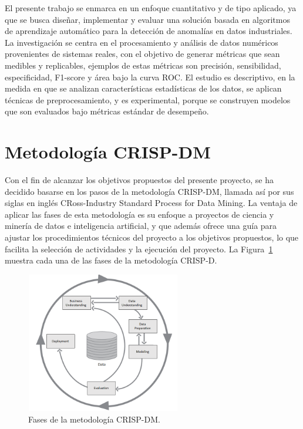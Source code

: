 \documentclass[11pt,a4paper,spanish]{book}
\numberwithin{equation}{chapter}
\numberwithin{figure}{chapter}
\begin{document}
El presente trabajo se enmarca en un enfoque cuantitativo y de tipo aplicado, ya que se 
busca diseñar, implementar y evaluar una solución basada en algoritmos de aprendizaje 
automático para la detección de anomalías en datos industriales. La investigación se 
centra en el procesamiento y análisis de datos numéricos provenientes de sistemas reales,
con el objetivo de generar métricas que sean medibles y replicables, ejemplos de estas 
métricas son precisión, sensibilidad, especificidad, F1-score y área bajo la curva ROC.
El estudio es descriptivo, en la medida en que se analizan características estadísticas 
de los datos, se aplican técnicas de preprocesamiento, y es experimental, porque se 
construyen modelos que son evaluados bajo métricas estándar de desempeño. 


\section{Metodología CRISP-DM}

Con el fin de alcanzar los objetivos propuestos del presente proyecto, se ha decidido 
basarse en los pasos de la metodología  CRISP-DM, llamada así por sus siglas en inglés 
CRoss-Industry Standard Process for Data Mining. La ventaja de aplicar las fases de esta
metodología es su enfoque a proyectos de ciencia y minería de datos e inteligencia 
artificial, y que además ofrece una guía para ajustar los procedimientos técnicos del 
proyecto a los objetivos propuestos, lo que facilita la selección de actividades y 
la ejecución del proyecto. La Figura~\ref{fig:figCrispdm} muestra cada una de las fases de la metodología 
CRISP-D.


\begin{figure}[h]
    \centering
    \includegraphics[width=0.6\textwidth]{media/crisp-dm.png}
    \caption{Fases de la metodología {CRISP-DM}.  \protect\cite{chapman2000crisp} }
    \label{fig:figCrispdm}
\end{figure}
\end{document}
